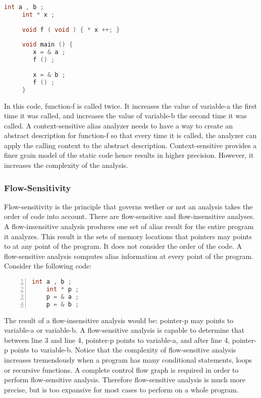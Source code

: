\begin{lstlisting}[language=C]
     int a , b ;
     int * x ;
    
     void f ( void ) { * x ++; }
    
     void main () {
        x = & a ;
        f () ;
        
        x = & b ;
        f () ;
     }
\end{lstlisting}



In this code, function-f is called twice. It increases the value of variable-a the first time it
was called, and increases the value of variable-b the second time it was called. A context-sensitive
alias analyzer needs to have a way to create an abstract description for function-f so that every
time it is called, the analyzer can apply the calling context to the abstract description.
Context-sensitive provides a finer grain model of the static code hence results in higher precision. However, it increases the complexity of the analysis.





\subsubsection{Flow-Sensitivity}


Flow-sensitivity is the principle that governs wether or not an analysis takes the order of code
into account. There are flow-sensitive and flow-insensitive analyses.
A flow-insensitive analysis produces one set of alias result for the entire program it analyzes.
This result is the sets of memory locations that pointers may points to at any point of the program.
It does not consider the order of the code. A flow-sensitive analysis computes alias information
at every point of the program. Consider the following code:



\begin{lstlisting}[language=C,numbers=left,
    numberstyle=\small\color{gray}]
    int a , b ;
    int * p ;
    p = & a ;
    p = & b ;
\end{lstlisting}



The result of a flow-insensitive analysis would be: pointer-p may points to variable-a or
variable-b. A flow-sensitive analysis is capable to determine that between line 3 and line 4,
pointer-p points to variable-a, and after line 4, pointer-p points to variable-b.
Notice that the complexity of flow-sensitive analysis increases tremendously when a program
has many conditional statements, loops or recursive functions. A complete control flow graph
is required in order to perform flow-sensitive analysis. Therefore flow-sensitive analysis is much
more precise, but is too expansive for most cases to perform on a whole program.




